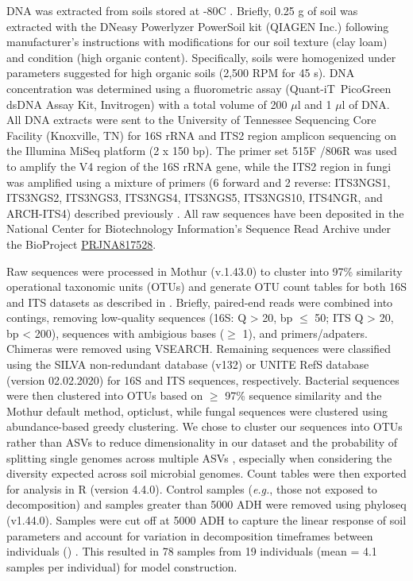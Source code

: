 \documentclass[
  10pt,
  letterpaper,
]{article}
\begin{document}
DNA was extracted from soils stored at -80\textdegree C
\citep{mason_body_2022}. Briefly, 0.25 g of soil was extracted with the
DNeasy Powerlyzer PowerSoil kit (QIAGEN Inc.) following manufacturer's
instructions with modifications for our soil texture (clay loam) and
condition (high organic content). Specifically, soils were homogenized
under parameters suggested for high organic soils (2,500 RPM for 45 s).
DNA concentration was determined using a fluorometric assay
(Quant-iT\texttrademark~PicoGreen\textregistered~ dsDNA Assay Kit,
Invitrogen) with a total volume of 200 \(\mu\)l and 1 \(\mu\)l of DNA.
All DNA extracts were sent to the University of Tennessee Sequencing
Core Facility (Knoxville, TN) for 16S rRNA and ITS2 region amplicon
sequencing on the Illumina MiSeq platform (2 x 150 bp). The primer set
515F \citep{parada_every_2016} /806R \citep{apprill_minor_2015} was used
to amplify the V4 region of the 16S rRNA gene, while the ITS2 region in
fungi was amplified using a mixture of primers (6 forward and 2 reverse:
ITS3NGS1, ITS3NGS2, ITS3NGS3, ITS3NGS4, ITS3NGS5, ITS3NGS10, ITS4NGR,
and ARCH-ITS4) described previously \citep{cregger_populus_2018}. All
raw sequences have been deposited in the National Center for
Biotechnology Information's Sequence Read Archive under the BioProject
\href{https://www.ncbi.nlm.nih.gov/bioproject/?term=PRJNA817528}{PRJNA817528}.

Raw sequences were processed in Mothur \citep{schloss_introducing_2009}
(v.1.43.0) to cluster into 97\% similarity operational taxonomic units
(OTUs) and generate OTU count tables for both 16S and ITS datasets as
described in \citep{mason_body_2022}. Briefly, paired-end reads were
combined into contings, removing low-quality sequences (16S: Q
\textgreater{} 20, bp \(\leq\) 50; ITS Q \textgreater{} 20, bp
\textless{} 200), sequences with ambigious bases (\(\geq\) 1), and
primers/adpaters. Chimeras were removed using VSEARCH. Remaining
sequences were classified using the SILVA non-redundant database
\citep{quast_silva_2013} (v132) or UNITE RefS database
\citep{abarenkov_unite_2020} (version 02.02.2020) for 16S and ITS
sequences, respectively. Bacterial sequences were then clustered into
OTUs based on \(\geq\) 97\% sequence similarity and the Mothur default
method, opticlust, while fungal sequences were clustered using
abundance-based greedy clustering. We chose to cluster our sequences
into OTUs rather than ASVs to reduce dimensionality in our dataset and
the probability of splitting single genomes across multiple ASVs
\citep{patrick_d_schloss_amplicon_2021}, especially when considering the
diversity expected across soil microbial genomes. Count tables were then
exported for analysis in R (version 4.4.0). Control samples
(\emph{e.g.}, those not exposed to decomposition) and samples greater
than 5000 ADH were removed using phyloseq \citep{mcmurdie_phyloseq_2013}
(v1.44.0). Samples were cut off at 5000 ADH to capture the linear
response of soil parameters and account for variation in decomposition
timeframes between individuals ()
\citep{mason_body_2022}. This resulted in 78 samples from 19 individuals
(mean = 4.1 samples per individual) for model construction.
\end{document}
